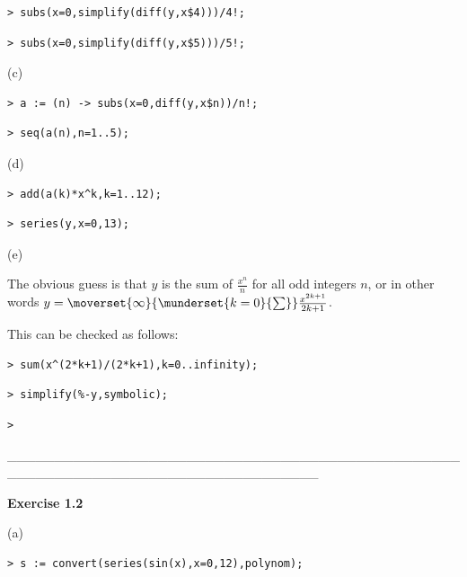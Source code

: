 \documentclass{article}
\begin{document}
\begin{lstlisting}
> subs(x=0,simplify(diff(y,x$4)))/4!;
\end{lstlisting}
\begin{lstlisting}
> subs(x=0,simplify(diff(y,x$5)))/5!;
\end{lstlisting}
\begin{Maple Normal}
(c)
\end{Maple Normal}
\begin{lstlisting}
> a := (n) -> subs(x=0,diff(y,x$n))/n!;
\end{lstlisting}
\begin{lstlisting}
> seq(a(n),n=1..5);
\end{lstlisting}
\begin{Maple Normal}
(d)
\end{Maple Normal}
\begin{lstlisting}
> add(a(k)*x^k,k=1..12);
\end{lstlisting}
\begin{lstlisting}
> series(y,x=0,13);
\end{lstlisting}
\begin{Maple Normal}
(e)
\end{Maple Normal}
\begin{Maple Normal}
The obvious guess is that 
$y$ is the sum of  
$\frac{x^{n}}{n}$ for all odd integers 
$n$, or in other words 
$y =\moverset{\infty}{\munderset{k =0}{\sum}}\frac{x^{2 k +1}}{2 k +1}$.\

This can be checked as follows:
\end{Maple Normal}
\begin{lstlisting}
> sum(x^(2*k+1)/(2*k+1),k=0..infinity);
\end{lstlisting}
\begin{lstlisting}
> simplify(%-y,symbolic);
\end{lstlisting}
\begin{lstlisting}
> 
\end{lstlisting}
\begin{Maple Normal}
\_\_\_\_\_\_\_\_\_\_\_\_\_\_\_\_\_\_\_\_\_\_\_\_\_\_\_\_\_\_\_\_\_\_\_\_\_\_\_\_\_\_\_\_\_\_\_\_\_\_\_\_\_\_\_\_\_\_\_\_\_\_\_\_\_\_\_\_\_\_\_\_\_\_\_\_\_\_\_\_\_
\end{Maple Normal}
\begin{Maple Heading 2}
\textbf{Exercise 1.2}
\end{Maple Heading 2}
\begin{Maple Normal}
(a)
\end{Maple Normal}
\begin{lstlisting}
> s := convert(series(sin(x),x=0,12),polynom);
\end{lstlisting}
\end{document}
